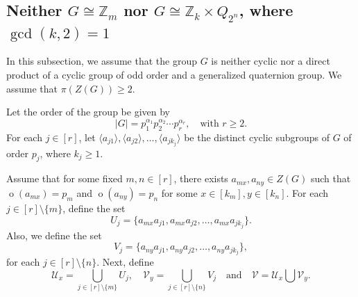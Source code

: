 \documentclass[12pt]{amsart}
\theoremstyle{plain}
\theoremstyle{remark}
\theoremstyle{definition}
\begin{document}

\subsection{Neither $G \cong \mathbb{Z}_m$ nor $G \cong \mathbb{Z}_k \times Q_{2^n}$, where $\gcd(k,2)=1$}


\smallskip
In this subsection, we assume that the group $G$ is neither cyclic nor a direct product of a cyclic group of odd order and a generalized quaternion group. We assume
that $\pi(Z(G))\ge 2.$

Let the order of the group be given by 
\[
|G| = p_1^{\alpha_1} p_2^{\alpha_2} \cdots p_r^{\alpha_r}, \quad \text{with } r \geq 2.
\]
For each $j \in [r]$, let $\langle a_{j1} \rangle, \langle a_{j2} \rangle, \dots, \langle a_{jk_j} \rangle$ be the distinct cyclic subgroups of $G$ of order $p_j$, where $k_j \geq 1$.

Assume that for some fixed $m, n \in [r]$, there exists $a_{mx}, a_{ny} \in Z(G)$ such that $\operatorname{o}(a_{mx}) = p_m$ and $\operatorname{o}(a_{ny}) = p_n$ for some $x \in [k_m], y\in [k_n]$. For each $j \in [r] \setminus \{m\}$, define the set
\[
U_j = \{ a_{mx} a_{j1}, a_{mx} a_{j2}, \dots, a_{mx} a_{jk_j} \}. 
\]
Also, we define the set
\[
V_j = \{ a_{ny} a_{j1}, a_{ny} a_{j2}, \dots, a_{ny} a_{jk_j} \},   
\]
for each $ j\in [r] \setminus \{n\}$.
Next, define
\[
\mathcal{U}_x = \bigcup_{j \in [r] \setminus \{m\}} U_j, \quad \mathcal{V}_y = \bigcup_{j \in [r] \setminus \{n\}} V_j  \quad \text{and} \quad \mathcal{V}=\mathcal{U}_x\bigcup \mathcal{V}_y.
\]

\end{document}
